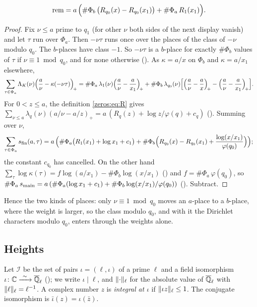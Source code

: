 \begin{proposition}\label{setup:prop:rem}
\[
  \mathrm{rem} = a\,\Bigl( \#\Phi_b\,\bigl( R_{q_0}(x) - R_{q_0}(x_1) \bigr) + \#\Phi_a\, R_1(x_1) \Bigr).
\]
\end{proposition}

\begin{proof}
Fix $\nu \le a$ prime to $q_1$ (for other $\nu$ both sides of the next display vanish) and let
$\tau$ run over $\Phi_a$. Then $-\nu\tau$ runs once over
the places of the class of $-\nu$ modulo $q_0$. The $b$-places have class $-1$. So $-\nu\tau$ is a
$b$-place for exactly $\#\Phi_b$ values of $\tau$ if $\nu \equiv 1 \bmod q_0$, and for none
otherwise (). As $\kappa = a/x$ on $\Phi_b$ and
$\kappa = a/x_1$ elsewhere,
\[
  \sum_{\tau\in\Phi_a} \Lambda_K(\nu)\Bigl(\frac a\nu - \kappa(-\nu\tau)\Bigr)_{\!+}
  = \#\Phi_a\,\lambda_1(\nu)\Bigl(\frac a\nu - \frac a{x_1}\Bigr)_{\!+}
  + \#\Phi_b\,\lambda_{q_0}(\nu)\Bigl[\Bigl(\frac a\nu - \frac a{x}\Bigr)_{\!+}
       - \Bigl(\frac a\nu - \frac a{x_1}\Bigr)_{\!+}\Bigr].
\]
For $0 < z \le a$, the definition \eqref{zeros:eq:R} gives
$\sum_{\nu \le a} \lambda_q(\nu)(a/\nu - a/z)_+ = a\,(R_q(z) + \log z/\varphi(q) + c_q)$
(). Summing over $\nu$,
\[
  \sum_{\tau\in\Phi_a} s_{\mathrm{fin}}(a,\tau)
  = a\,\Bigl( \#\Phi_a\bigl(R_1(x_1) + \log x_1 + c_1\bigr)
     + \#\Phi_b\Bigl(R_{q_0}(x) - R_{q_0}(x_1) + \frac{\log(x/x_1)}{\varphi(q_0)}\Bigr) \Bigr);
\]
the constant $c_{q_0}$ has cancelled. On the other hand
$\sum_\tau \log\kappa(\tau) = f\log(a/x_1) - \#\Phi_b\log(x/x_1)$
() and $f = \#\Phi_a\,\varphi(q_0)$, so $\#\Phi_a\,s_{\mathrm{main}} = a\,(\#\Phi_a(\log x_1 + c_1) + \#\Phi_b\log(x/x_1)/\varphi(q_0))$
(). Subtract.
\end{proof}

Hence the two kinds of places: only $\nu \equiv 1 \bmod q_0$ moves an $a$-place to a $b$-place,
where the weight is larger, so the class modulo $q_0$, and with it the Dirichlet characters
modulo $q_0$, enters through the weights alone.

\subsection{Heights}

Let $\mathcal{I}$ be the set of pairs $\iota = (\ell, \iota)$ of a prime $\ell$ and a field
isomorphism $\iota \colon \mathbb{C} \xrightarrow{\ \sim\ } \overline{\mathbb{Q}}_\ell$ (); we write $\iota \mid \ell$,
and $\lVert\cdot\rVert_\ell$ for the absolute value of $\overline{\mathbb{Q}}_\ell$ with $\lVert\ell\rVert_\ell = \ell^{-1}$. A
complex number $z$ is \emph{integral at $\iota$} if $\lVert\iota z\rVert_\ell \le 1$. The conjugate
isomorphism is $\bar\iota(z) = \iota(\bar z)$.

